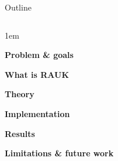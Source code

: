 \begin{frame}{Outline}
    \begin{columns}
        \begin{itemize-size}{1em} 
            \item \textbf{Problem \& goals}
            \item \textbf{What is RAUK}
            \item \textbf{Theory}
            \item \textbf{Implementation}
            \item \textbf{Results}
            \item \textbf{Limitations \& future work}
        \end{itemize-size}
        
    \end{columns}
\end{frame}

